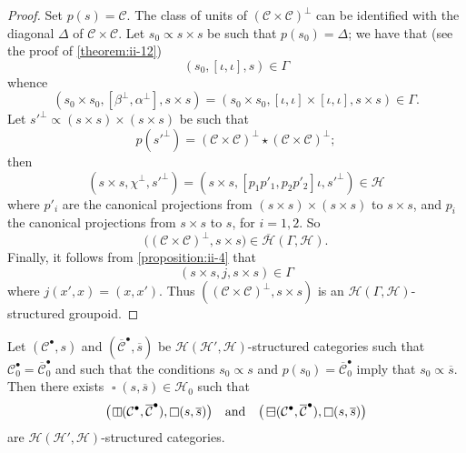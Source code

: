 \documentclass[a4paper,fleqn]{article}
\theoremstyle{plain}
\newenvironment{theorem}[1]
  {\renewcommand\theinnertheorem{#1}\innertheorem}
  {\endinnertheorem}
\theoremstyle{definition}
\newcommand{\oldpage}[1]{{\marginpar{\footnotesize$\bigg\vert$\,\,\,\,\textit{p.~#1}}}}
\newcommand{\textand}{\quad\text{and}\quad}
\newcommand{\CC}{\mathcal{C}}
\newcommand{\HH}{\mathcal{H}}
\newcommand{\subs}{\mathrel{\propto}}
\newcommand{\hsqbox}{{\boxminus}}
\newcommand{\vsqbox}{{\rotatebox{90}{$\boxminus$}}}
\DeclareMathOperator{\sq}{\square}
\DeclareMathOperator{\hsq}{\raisebox{-.05em}{$\hsqbox$}}
\DeclareMathOperator{\vsq}{\raisebox{-.1em}{$\vsqbox$}}
\newcommand{\smallbullet}{\bullet}
\begin{document}
\begin{proof}
  Set $p(s)=\CC$.
  The class of units of $(\CC\times\CC)^\perp$ can be identified with the diagonal $\Delta$ of $\CC\times\CC$.
  Let $s_0\subs s\times s$ be such that $p(s_0)=\Delta$;
  we have that (see the proof of \cref{theorem:ii-12})
  \[
    (s_0,[\iota,\iota],s)
    \in \Gamma
  \]
  whence
  \[
    (s_0\times s_0,[\beta^\perp,\alpha^\perp],s\times s)
    = (s_0\times s_0,[\iota,\iota]\times[\iota,\iota],s\times s)
    \in\Gamma.
  \]
  Let $s'^\perp\subs(s\times s)\times(s\times s)$ be such that
  \[
    p(s'^\perp)
    = (\CC\times\CC)^\perp\star(\CC\times\CC)^\perp;
  \]
  then
  \[
    (s\times s,\chi^\perp,s'^\perp)
    = (s\times s,[p_1p'_1,p_2p'_2]\iota,s'^\perp)
    \in\HH
  \]
  where $p'_i$ are the canonical projections from $(s\times s)\times(s\times s)$ to $s\times s$, and $p_i$ the canonical projections from $s\times s$ to $s$, for $i=1,2$.
  So
  \[
    \big((\CC\times\CC)^\perp,s\times s\big)
    \in\overline{\HH}(\Gamma,\HH).
  \]
  Finally, it follows from \cref{proposition:ii-4} that
  \[
    (s\times s,j,s\times s)\in\Gamma
  \]
  where $j(x',x)=(x,x')$.
  Thus $((\CC\times\CC)^\perp,s\times s)$ is an $\HH(\Gamma,\HH)$-structured groupoid.
\end{proof}

\begin{theorem}{15}
\label{theorem:ii-15}
  Let $(\CC^\smallbullet,s)$ and $(\overline{\CC}^\smallbullet,\overline{s})$ be $\HH(\HH',\HH)$-structured categories such that $\CC_0^\smallbullet=\overline{\CC}_0^\smallbullet$ and such that the conditions $s_0\subs s$ and $p(s_0)=\overline{\CC}_0^\smallbullet$ imply that $s_0\subs\overline{s}$.
  \oldpage{419}
  Then there exists $\sq(s,\overline{s})\in\HH_0$ such that
  \[
    \big(\vsq(\CC^\smallbullet,\overline{\CC}^\smallbullet),\sq(s,\overline{s})\big)
    \textand
    \big(\hsq(\CC^\smallbullet,\overline{\CC}^\smallbullet),\sq(s,\overline{s})\big)
  \]
  are $\HH(\HH',\HH)$-structured categories.
\end{theorem}
\end{document}
